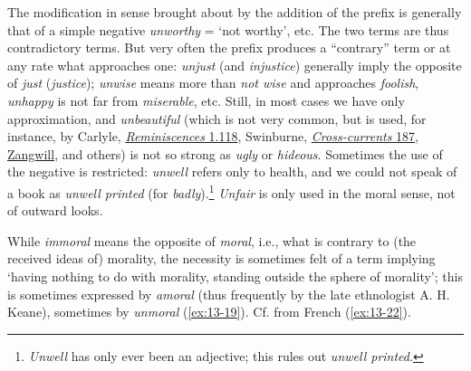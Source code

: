 \bigskip

The modification in sense brought about by the addition of the prefix is generally that of a simple negative \textit{unworthy} = `not worthy', etc. The two terms are thus contradictory terms. But very often the prefix produces a ``contrary'' term or at any rate what approaches one: \textit{unjust} (and \textit{injustice}) generally imply the opposite of \textit{just} (\textit{justice}); \textit{unwise} means more than \textit{not wise} and approaches \textit{foolish}, \textit{unhappy} is not far from \textit{miserable}, etc. Still, in most cases we have only approximation, and \textit{unbeautiful} (which is not very common, but is used, for instance, by Carlyle, \href{https://archive.org/details/reminiscences0000thom_e9a0/page/92/mode/2up?q=%22unbeautiful%22&view=theater}{\textit{Reminiscences} 1.118}, Swinburne, \href{https://archive.org/details/lovescrosscurren00swinuoft/page/170/mode/2up?q=unbeautiful&view=theater}{\textit{Cross-currents} 187}, \href{https://archive.org/details/greywigstoriesno00zang/page/238/mode/2up?q=%22unbeautiful%22&view=theater}{Zangwill}, and others) is not so strong as \textit{ugly} or \textit{hideous}. Sometimes the use of the negative is restricted: \textit{unwell} refers only to health, and we could not speak of a book as \textit{unwell printed} (for \textit{badly}).\footnote{\textit{Unwell} has only ever been an adjective; this rules out \textit{unwell printed}. \eds} \textit{Unfair} is only used in the moral sense, not of outward looks.

\label{amoral}While \textit{immoral} means the opposite of \textit{moral}, i.e., what is contrary to (the received ideas of) morality, the necessity is sometimes felt of a term implying `having nothing to do with morality, standing outside the sphere of morality'; this is sometimes expressed by \textit{amoral} (thus frequently by the late ethnologist A. H. Keane), %
sometimes by \textit{unmoral} (\ref{ex:13-19}). Cf. from French (\ref{ex:13-22}).

